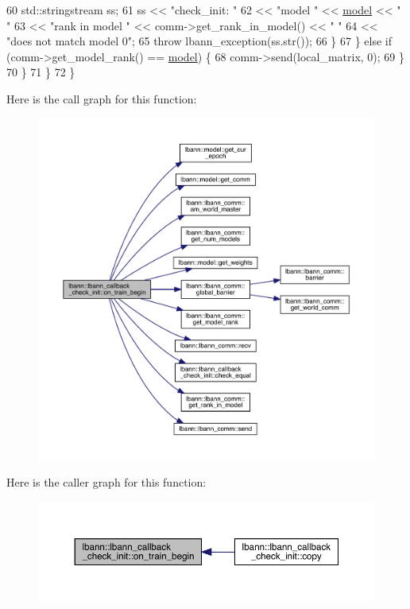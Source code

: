 \begin{DoxyCode}
60           std::stringstream ss;
61           ss << \textcolor{stringliteral}{"check\_init: "}
62              << \textcolor{stringliteral}{"model "} << \hyperlink{namespacelbann_adee41f31f15f3906cbdcce4a1417eb56a20f35e630daf44dbfa4c3f68f5399d8c}{model} << \textcolor{stringliteral}{" "}
63              << \textcolor{stringliteral}{"rank in model "} << comm->get\_rank\_in\_model() << \textcolor{stringliteral}{" "}
64              << \textcolor{stringliteral}{"does not match model 0"};
65           \textcolor{keywordflow}{throw} lbann\_exception(ss.str());
66         \}
67       \} \textcolor{keywordflow}{else} \textcolor{keywordflow}{if} (comm->get\_model\_rank() == \hyperlink{namespacelbann_adee41f31f15f3906cbdcce4a1417eb56a20f35e630daf44dbfa4c3f68f5399d8c}{model}) \{
68         comm->send(local\_matrix, 0);
69       \}
70     \}
71   \}
72 \}
\end{DoxyCode}
Here is the call graph for this function\+:\nopagebreak
\begin{figure}[H]
\begin{center}
\leavevmode
\includegraphics[width=350pt]{classlbann_1_1lbann__callback__check__init_a037f1371c56c1b528f487517a58ce3fb_cgraph}
\end{center}
\end{figure}
Here is the caller graph for this function\+:\nopagebreak
\begin{figure}[H]
\begin{center}
\leavevmode
\includegraphics[width=350pt]{classlbann_1_1lbann__callback__check__init_a037f1371c56c1b528f487517a58ce3fb_icgraph}
\end{center}
\end{figure}
